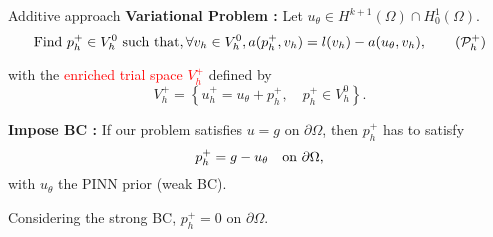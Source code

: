 \begin{frame}{Additive approach}
	\textbf{Variational Problem :} Let $u_{\theta} \in H^{k+1}(\Omega)\cap H^1_0(\Omega)$.
	\begin{equation}
		\label{eq:weakplus}
		\text{Find } p_h^+ \in V_h^0 \text{ such that}, \forall v_h \in V_h^0, a(p_h^+,v_h) = l(v_h) - a(u_{\theta},v_h),\tag{$\mathcal{P}_h^+$}
	\end{equation}
	\begin{minipage}[t]{0.6\linewidth}
		with the \textcolor{red}{enriched trial space $V_h^+$} defined by
		\begin{equation*}
			V_h^+ = \left\{
			u_h^+= u_{\theta} + p_h^+, \quad p_h^+ \in V_h^0
			\right\}.
		\end{equation*}
	
		\vspace{10pt}
	
		\textbf{Impose BC :} If our problem satisfies $u=g$ on $\partial \Omega$,
		then $p_h^+$ has to satisfy
		\[
			p_h^+ = g - u_{\theta} \text{\quad on } \partial \Omega,
		\]
		with $u_\theta$ the PINN prior (weak BC). 
	
		\vspace{10pt}
	
		Considering the strong BC, $p_h^+=0$ on $\partial \Omega$.
	\end{minipage} \qquad \begin{minipage}[t][][b]{0.28\linewidth}
		\vspace{-8pt}
		\centering
	\end{minipage}
\end{frame}

